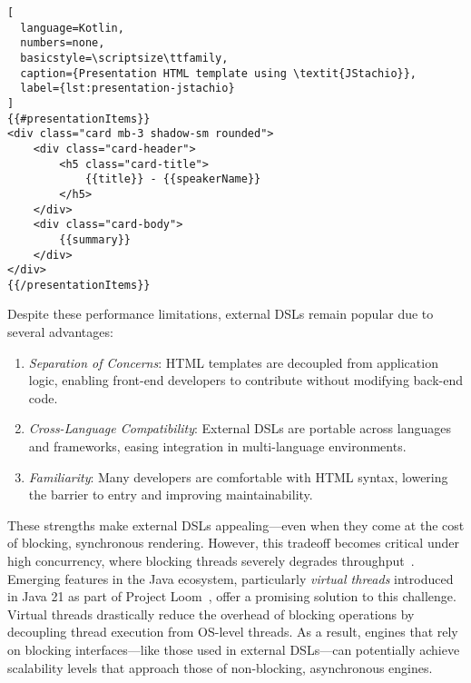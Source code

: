 \lstset{style=listingstyle}
\begin{center}
\begin{minipage}{0.70\textwidth}
\begin{lstlisting}[
  language=Kotlin,
  numbers=none,
  basicstyle=\scriptsize\ttfamily,
  caption={Presentation HTML template using \textit{JStachio}},
  label={lst:presentation-jstachio}
]
{{#presentationItems}}
<div class="card mb-3 shadow-sm rounded">
    <div class="card-header">
        <h5 class="card-title">
            {{title}} - {{speakerName}}
        </h5>
    </div>
    <div class="card-body">
        {{summary}}
    </div>
</div>
{{/presentationItems}}
\end{lstlisting}
\end{minipage}
\end{center}

Despite these performance limitations, external DSLs remain popular due to
several advantages:

\begin{enumerate}
    \item \emph{Separation of Concerns}: HTML templates are decoupled from application logic, enabling front-end developers to contribute without modifying back-end code.
    \item \emph{Cross-Language Compatibility}: External DSLs are portable across languages and frameworks, easing integration in multi-language environments.
    \item \emph{Familiarity}: Many developers are comfortable with HTML syntax, lowering the barrier to entry and improving maintainability.
\end{enumerate}

These strengths make external DSLs appealing—even when they come at the cost of
blocking, synchronous rendering. However, this tradeoff becomes critical under
high concurrency, where blocking threads severely degrades throughput~\cite{PSSR-WISE2024}.
Emerging features in the Java ecosystem, particularly \textit{virtual threads}
introduced in Java 21 as part of Project Loom~\cite{Veen2024}, offer a promising solution to
this challenge. Virtual threads drastically reduce the overhead of blocking
operations by decoupling thread execution from OS-level threads. As a result,
engines that rely on blocking interfaces—like those used in
external DSLs—can potentially achieve scalability levels that approach those of
non-blocking, asynchronous engines.

